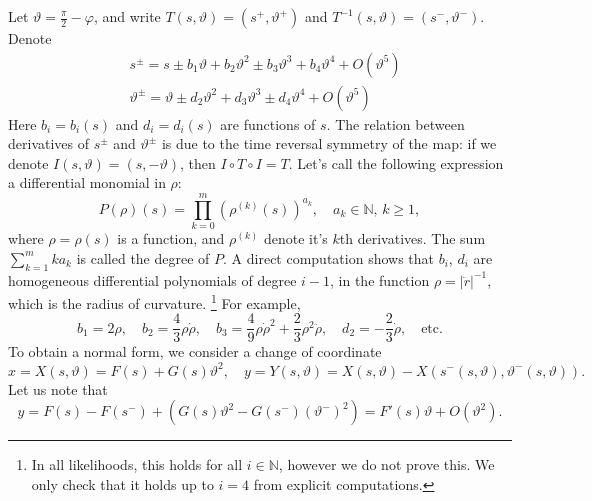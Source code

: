\documentclass[12pt,reqno]{amsart}
\theoremstyle{remark}
\begin{document}
Let $\vartheta = \frac{\pi}2 - \varphi$, and write $T(s, \vartheta) = (s^+, \vartheta^+)$  and $T^{-1}(s, \vartheta) =(s^-, \vartheta^-)$. Denote 
\[
	\begin{aligned}
	& s^\pm  = s  \pm b_1 \vartheta + b_2  \vartheta^2 \pm b_3 \vartheta^3 + b_4 \vartheta^4 + O(\vartheta^5)\\
	& \vartheta^\pm = \vartheta \pm d_2 \vartheta^2 + d_3 \vartheta^3 \pm d_4 \vartheta^4 + O(\vartheta^5) 
	\end{aligned}
\]
Here $b_i = b_i(s)$ and $d_i = d_i(s)$ are functions of $s$. The relation between derivatives of $s^\pm$ and $\vartheta^\pm$ is due to the time reversal symmetry of the map: if we denote $I(s, \vartheta) = (s, -\vartheta)$, then $I \circ T \circ I = T$. 
Let's call the following expression a differential monomial in $\rho$:
\[
	P(\rho)(s)  = \prod_{k = 0}^m \left( \rho^{(k)}(s) \right)^{a_k}, \quad a_k \in {\mathbb{N}}, \, k \ge 1,  
\]
where $\rho = \rho(s)$ is a function, and $\rho^{(k)}$ denote it's $k$th derivatives. The sum $\sum_{k =1}^m k a_k$ is called the degree of $P$. A direct computation shows that $b_i$, $d_i$ are homogeneous differential polynomials of degree $i-1$, in the function $\rho = |\ddot{r}|^{-1}$, which is the radius of curvature.
\footnote{In all likelihoods, this holds for all $i \in {\mathbb{N}}$, however we do not prove this. We only check that it holds up to $i = 4$ from explicit computations. }
For example, 
\[
	b_1 = 2\rho, \quad b_2 = \frac43 \rho \dot{\rho}, \quad b_3 = \frac49 \rho \dot{\rho}^2 + \frac23 \rho^2 \ddot{\rho}, \quad d_2 = -\frac23 \dot{\rho}, \quad
	\text{etc.}
\]
To obtain a normal form, we consider a change of coordinate 
\begin{equation}
  \label{eq:6th-lautkin}
  	x = X(s, \vartheta) = F(s) + G(s) \vartheta^2, \quad y = Y(s, \vartheta) =  X(s, \vartheta) - X(s^-(s, \vartheta), \vartheta^-(s, \vartheta)). 
\end{equation}
Let us note that 
\begin{equation}
  \label{eq:Phi-y}
 	y = F(s) - F(s^-) + \left( G(s) \vartheta^2 - G(s^-) (\vartheta^-)^2 \right) = F'(s) \vartheta + O(\vartheta^2). 
\end{equation} 
\end{document}
